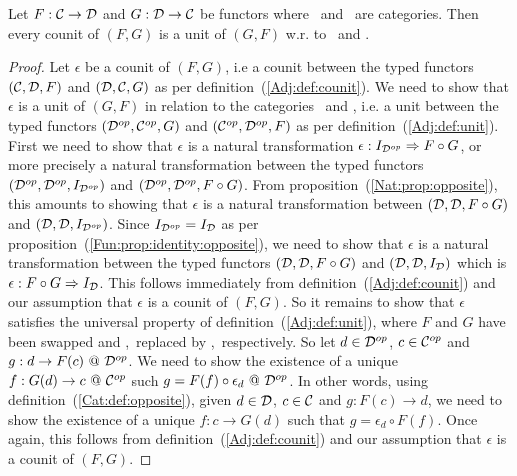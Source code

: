 \begin{prop}\label{Adj:prop:counit:opposite}
    Let $F:\mbox{$\cal C$}\to\mbox{$\cal D$}$ and $G:\mbox{$\cal D$}\to\mbox{$\cal C$}$ be functors where \Cat\ and \Dat\ 
    are categories. Then every counit of $(F,G)$ is
    a unit of $(G,F)$ w.r. to \Dop\ and \Cop.
\end{prop}
\begin{proof}
    Let $\epsilon$ be a counit of $(F,G)$, i.e a counit between the typed functors 
    $(\mbox{$\cal C$},\mbox{$\cal D$},F)$ and $(\mbox{$\cal D$},\mbox{$\cal C$},G)$ as per definition~(\ref{Adj:def:counit}).
    We need to show that $\epsilon$ is a unit of $(G,F)$ in relation to the 
    categories \Dop\ and \Cop, i.e. a unit between the typed functors
    $(\mbox{${\cal D}^{op}$},\mbox{${\cal C}^{op}$},G)$ and $(\mbox{${\cal C}^{op}$},\mbox{${\cal D}^{op}$},F)$ as per definition~(\ref{Adj:def:unit}).
    First we need to show that $\epsilon$ is a natural transformation
    $\epsilon: I_{{\cal D}^{op}}\Rightarrow F\circ G$, or more precisely a natural
    transformation between the typed functors $(\mbox{${\cal D}^{op}$},\mbox{${\cal D}^{op}$},I_{{\cal D}^{op}})$ and
    $(\mbox{${\cal D}^{op}$},\mbox{${\cal D}^{op}$},F\circ G)$. From proposition~(\ref{Nat:prop:opposite}),
    this amounts to showing that $\epsilon$ is a natural transformation between
    $(\mbox{$\cal D$},\mbox{$\cal D$},F\circ G)$ and $(\mbox{$\cal D$},\mbox{$\cal D$},I_{{\cal D}^{op}})$. Since 
    $I_{{\cal D}^{op}}=I_{\cal D}$ as per 
    proposition~(\ref{Fun:prop:identity:opposite}), we need to show that
    $\epsilon$ is a natural transformation between the typed functors 
    $(\mbox{$\cal D$},\mbox{$\cal D$},F\circ G)$ and  $(\mbox{$\cal D$},\mbox{$\cal D$},I_{\cal D})$ which is
    $\epsilon:F\circ G\Rightarrow I_{\cal D}$. This follows immediately from 
    definition~(\ref{Adj:def:counit}) and our assumption that $\epsilon$ is 
    a counit of $(F,G)$. So it remains to show that $\epsilon$ satisfies the 
    universal property of definition~(\ref{Adj:def:unit}), where
    $F$ and $G$ have been swapped and \Cat,\Dat\ replaced by \Dop,\Cop\
    respectively. So let $d\in\mbox{${\cal D}^{op}$}$, $c\in\mbox{${\cal C}^{op}$}$ and $g:d\to F(c)\ @\ \mbox{${\cal D}^{op}$}$.
    We need to show the existence of a unique $f:G(d)\to c\ @\ \Cop$ such
    $g=F(f)\circ\epsilon_{d}\ @\ \Dop$. In other words, using
    definition~(\ref{Cat:def:opposite}), given $d\in\mbox{$\cal D$}$, $c\in\mbox{$\cal C$}$ and 
    $g:F(c)\to d$, we need to show the existence of a unique $f:c\to G(d)$ 
    such that $g=\epsilon_{d}\circ F(f)$. Once again, this follows from 
    definition~(\ref{Adj:def:counit}) and our assumption that $\epsilon$ is a 
    counit of $(F,G)$. 
\end{proof}


